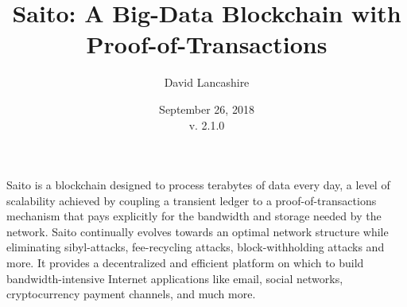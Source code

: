 \documentclass[11.5pt, oneside]{article}   	%
\title{Saito: A Big-Data Blockchain with Proof-of-Transactions}
\author{David Lancashire}
\date{September 26, 2018\\v. 2.1.0}
\begin{document}
\maketitle


\begin{onecolabstract}
Saito is a blockchain designed to process terabytes of data every day, a level of scalability achieved by coupling a transient ledger to a proof-of-transactions mechanism that pays explicitly for the bandwidth and storage needed by the network. Saito continually evolves towards an optimal network structure while eliminating sibyl-attacks, fee-recycling attacks, block-withholding attacks and more. It provides a decentralized and efficient platform on which to build bandwidth-intensive Internet applications like email, social networks, cryptocurrency payment channels, and much more.
\end{onecolabstract}
\end{document}

